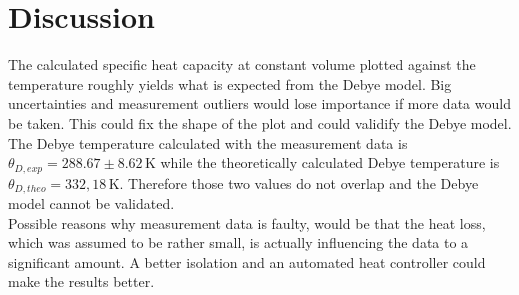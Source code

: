 \chapter{Discussion}
\label{cha:discussion}
The calculated specific heat capacity at constant volume plotted against the temperature roughly yields
what is expected from the Debye model. Big uncertainties and measurement outliers would lose importance 
if more data would be taken. This could fix the shape of the plot and could validify the Debye model.\\
The Debye temperature calculated with the measurement data is $\theta_{D,exp} =288.67 \pm 8.62 \, \unit{\kelvin}$ while the theoretically
calculated Debye temperature is $\theta_{D,theo} = 332, 18 \, \unit{\kelvin}$. Therefore those two values do not
overlap and the Debye model cannot be validated. \\
Possible reasons why measurement data is faulty, would be that the heat loss, which was assumed to be rather
small, is actually influencing the data to a significant amount. A better isolation and an automated heat controller
could make the results better.